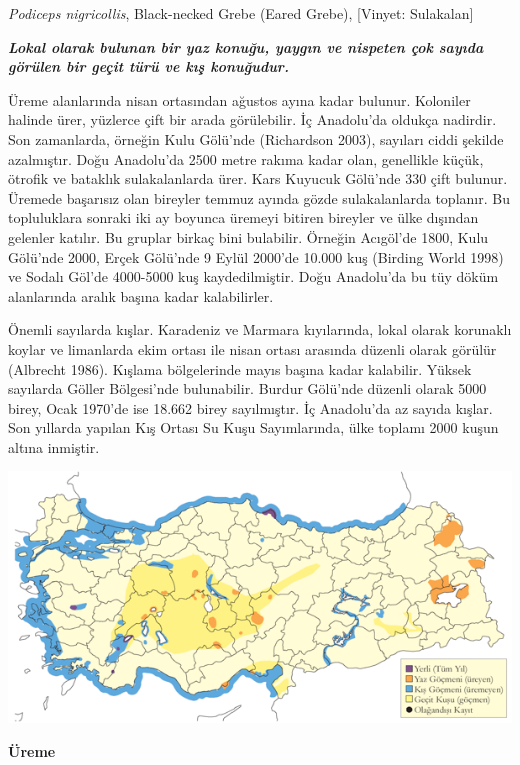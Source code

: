 \documentclass[
  letterpaper,
  DIV=11,
  numbers=noendperiod]{scrreprt}
\begin{document}
\emph{Podiceps nigricollis}, Black-necked Grebe (Eared Grebe),
{[}Vinyet: Sulakalan{]}

\textbf{\emph{Lokal olarak bulunan bir yaz konuğu, yaygın ve nispeten
çok sayıda görülen bir geçit türü ve kış konuğudur.}}

Üreme alanlarında nisan ortasından ağustos ayına kadar bulunur.
Koloniler halinde ürer, yüzlerce çift bir arada görülebilir. İç
Anadolu'da oldukça nadirdir. Son zamanlarda, örneğin Kulu Gölü'nde
(Richardson 2003), sayıları ciddi şekilde azalmıştır. Doğu Anadolu'da
2500 metre rakıma kadar olan, genellikle küçük, ötrofik ve bataklık
sulakalanlarda ürer. Kars Kuyucuk Gölü'nde 330 çift bulunur. Üremede
başarısız olan bireyler temmuz ayında gözde sulakalanlarda toplanır. Bu
topluluklara sonraki iki ay boyunca üremeyi bitiren bireyler ve ülke
dışından gelenler katılır. Bu gruplar birkaç bini bulabilir. Örneğin
Acıgöl'de 1800, Kulu Gölü'nde 2000, Erçek Gölü'nde 9 Eylül 2000'de
10.000 kuş (Birding World 1998) ve Sodalı Göl'de 4000-5000 kuş
kaydedilmiştir. Doğu Anadolu'da bu tüy döküm alanlarında aralık başına
kadar kalabilirler.

Önemli sayılarda kışlar. Karadeniz ve Marmara kıyılarında, lokal olarak
korunaklı koylar ve limanlarda ekim ortası ile nisan ortası arasında
düzenli olarak görülür (Albrecht 1986). Kışlama bölgelerinde mayıs
başına kadar kalabilir. Yüksek sayılarda Göller Bölgesi'nde bulunabilir.
Burdur Gölü'nde düzenli olarak 5000 birey, Ocak 1970'de ise 18.662 birey
sayılmıştır. İç Anadolu'da az sayıda kışlar. Son yıllarda yapılan Kış
Ortası Su Kuşu Sayımlarında, ülke toplamı 2000 kuşun altına inmiştir.

\includegraphics{images/harita_Page_055.png}

\textbf{Üreme}
\end{document}
